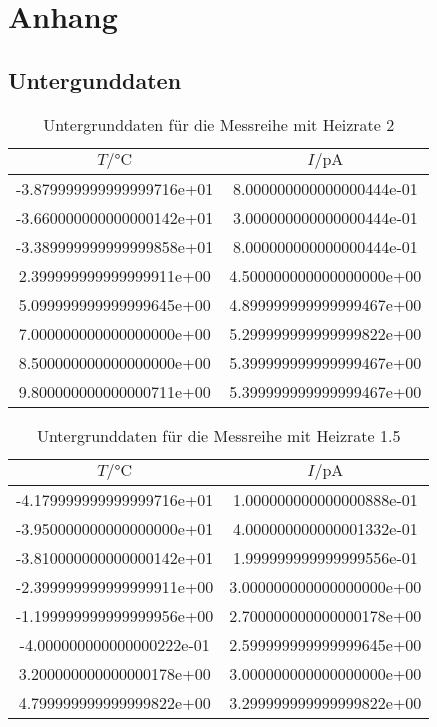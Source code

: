 \section{Anhang}
\label{sec:Anhang}
\subsection{Untergunddaten}
\begin{table}
 \centering
 \begin{tabular}{S S}
   \toprule
    $T / \si{\celsius}$ &  $I/ \si{\pico\ampere} $\\
   \midrule
	-3.879999999999999716e+01 & 8.000000000000000444e-01\\
	-3.660000000000000142e+01 & 3.000000000000000444e-01\\
	-3.389999999999999858e+01 & 8.000000000000000444e-01\\
	2.399999999999999911e+00 & 4.500000000000000000e+00\\
	5.099999999999999645e+00 & 4.899999999999999467e+00\\
	7.000000000000000000e+00 & 5.299999999999999822e+00\\
	8.500000000000000000e+00 & 5.399999999999999467e+00\\
	9.800000000000000711e+00 & 5.399999999999999467e+00\\
   \bottomrule
 \end{tabular}
 \caption{Untergrunddaten für die Messreihe mit Heizrate 2}
 \label{tab:WU2tab}
\end{table}
\begin{table}
 \centering
 \begin{tabular}{S S}
   \toprule
    $T / \si{\celsius}$ &  $I/ \si{\pico\ampere} $\\
   \midrule
	-4.179999999999999716e+01 & 1.000000000000000888e-01\\
	-3.950000000000000000e+01 & 4.000000000000001332e-01\\
	-3.810000000000000142e+01 & 1.999999999999999556e-01\\
	-2.399999999999999911e+00 & 3.000000000000000000e+00\\
	-1.199999999999999956e+00 & 2.700000000000000178e+00\\
	-4.000000000000000222e-01 & 2.599999999999999645e+00\\
	3.200000000000000178e+00 & 3.000000000000000000e+00\\
	4.799999999999999822e+00 & 3.299999999999999822e+00\\
   \bottomrule
 \end{tabular}
 \caption{Untergrunddaten für die Messreihe mit Heizrate 1.5}
 \label{tab:WU15tab}
\end{table}
\FloatBarrier
